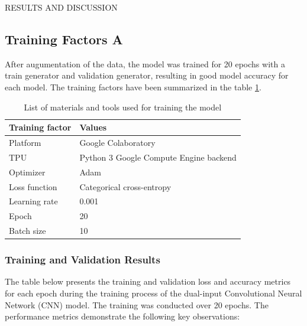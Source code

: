 \begin{section}[]{\uppercase{Results and Discussion}}

 \subsection{Training Factors A}
 After augumentation of the data, the model was trained for 20 epochs with a train generator and validation generator, resulting in good model accuracy for each model. 
 The training factors have been summarized in the table \ref{tab:training_factors}.

 \begin{table}[htbp]
    \centering
    \begin{tabular}{ll}
        \toprule
        \textbf{Training factor} & \textbf{Values} \\
        \midrule
        Platform & Google Colaboratory \\
        TPU & Python 3 Google Compute Engine backend \\
        Optimizer & Adam \\
        Loss function & Categorical cross-entropy \\
        Learning rate & 0.001 \\
        Epoch & 20 \\
        Batch size & 10 \\
        \bottomrule
    \end{tabular}
    \caption{List of materials and tools used for training the model}
    \label{tab:training_factors}
\end{table}


\subsubsection{Training and Validation Results}

The table below presents the training and validation loss and accuracy metrics for each epoch during the training process of the dual-input Convolutional Neural Network (CNN) model. The training was conducted over 20 epochs. The performance metrics demonstrate the following key observations:


\end{section}
